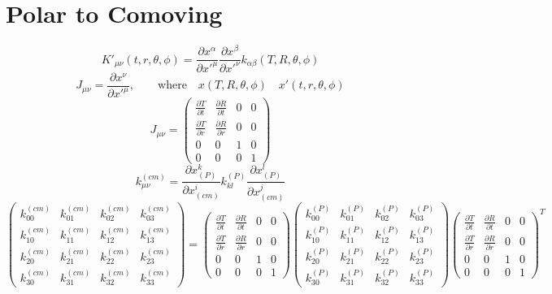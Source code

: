 \documentclass[10pt,letterpaper]{article}
\begin{document}
\section*{Polar to Comoving}
\begin{equation}
K'_{\mu\nu}(t,r,\theta,\phi) = \frac{\partial x^\alpha}{\partial x'^\mu}\frac{\partial x^\beta}{\partial x'^\nu} k_{\alpha\beta}(T,R,\theta,\phi)
\end{equation}
\begin{equation}
J_{\mu\nu} = \frac{\partial x^\nu}{\partial x'^\mu},\qquad\text{where}\quad x(T,R,\theta,\phi)\quad x'(t,r,\theta,\phi)
\end{equation}
\begin{equation}
\renewcommand*{\arraystretch}{1.5}
J_{\mu\nu} = 
\begin{pmatrix}
\frac{\partial T}{\partial t}&\frac{\partial R}{\partial t}&0&0\\
\frac{\partial T}{\partial r}&\frac{\partial R}{\partial r}&0&0\\
0&0&1&0\\
0&0&0&1
\end{pmatrix}
\end{equation}
\begin{equation}
k^{(cm)}_{\mu\nu} = \frac{\partial x_{(P)}^k}{\partial x_{(cm)}^i}k^{(P)}_{kl}\frac{\partial x_{(P)}^l}{\partial x_{(cm)}^j}
\end{equation}
\begin{equation}
\renewcommand*{\arraystretch}{1.5}
\begin{pmatrix}
k^{(cm)}_{00}&k^{(cm)}_{01}&k^{(cm)}_{02}&k^{(cm)}_{03}\\
k^{(cm)}_{10}&k^{(cm)}_{11}&k^{(cm)}_{12}&k^{(cm)}_{13}\\
k^{(cm)}_{20}&k^{(cm)}_{21}&k^{(cm)}_{22}&k^{(cm)}_{23}\\
k^{(cm)}_{30}&k^{(cm)}_{31}&k^{(cm)}_{32}&k^{(cm)}_{33} \end{pmatrix}
=
\begin{pmatrix}
\frac{\partial T}{\partial t}&\frac{\partial R}{\partial t}&0&0\\
\frac{\partial T}{\partial r}&\frac{\partial R}{\partial r}&0&0\\
0&0&1&0\\
0&0&0&1
\end{pmatrix}
\begin{pmatrix}
k^{(P)}_{00}&k^{(P)}_{01}&k^{(P)}_{02}&k^{(P)}_{03}\\
k^{(P)}_{10}&k^{(P)}_{11}&k^{(P)}_{12}&k^{(P)}_{13}\\
k^{(P)}_{20}&k^{(P)}_{21}&k^{(P)}_{22}&k^{(P)}_{23}\\
k^{(P)}_{30}&k^{(P)}_{31}&k^{(P)}_{32}&k^{(P)}_{33} 
\end{pmatrix}
\begin{pmatrix}
\frac{\partial T}{\partial t}&\frac{\partial R}{\partial t}&0&0\\
\frac{\partial T}{\partial r}&\frac{\partial R}{\partial r}&0&0\\
0&0&1&0\\
0&0&0&1
\end{pmatrix}^T
\end{equation}
\end{document}
